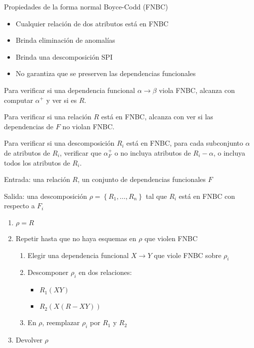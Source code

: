 \documentclass[a4paper, twoside]{article}
\begin{document}
\begin{propiedades}[0.9\textwidth]{Propiedades de la forma normal Boyce-Codd (FNBC)}
	\begin{itemize}
		\item Cualquier relación de dos atributos está en FNBC
		\item Brinda eliminación de anomalías
		\item Brinda una descomposición SPI
		\item No garantiza que se preserven las dependencias funcionales
	\end{itemize}
\end{propiedades}

Para verificar si una dependencia funcional $\alpha\to\beta$ viola FNBC, alcanza con computar $\alpha^{+}$ y ver si es $R$.

Para verificar si una relación $R$ está en FNBC, alcanza con ver si las dependencias de $F$ no violan FNBC.

Para verificar si una descomposición $R_{i}$ está en FNBC, para cada subconjunto $\alpha$ de atributos de $R_{i}$, verificar que $\alpha_{F}^{+}$ o no incluya atributos de $R_{i}-\alpha$, o incluya todos los atributos de $R_{i}$.

\begin{algorithm}[H]
	Entrada: una relación $R$, un conjunto de dependencias funcionales $F$

	Salida: una descomposición $\rho=\left\{ R_{1},\ldots,R_{n}\right\}$ tal que $R_{i}$ está en FNBC con respecto a $F_{i}$
	\begin{enumerate}
		\item $\rho=R$
		\item Repetir hasta que no haya esquemas en $\rho$ que violen FNBC
		\begin{enumerate}
			\item Elegir una dependencia funcional $X\to Y$ que viole FNBC sobre $\rho_{i}$
			\item Descomponer $\rho_{i}$ en dos relaciones:
			\begin{itemize}
				\item $R_{1}(XY)$
				\item $R_{2}(X(R-XY))$
			\end{itemize}
			\item En $\rho$, reemplazar $\rho_{i}$ por $R_{1}$ y $R_{2}$
		\end{enumerate}
	\item Devolver $\rho$
	\end{enumerate}
	\caption{Descomposición FNBC}
\end{algorithm}
\end{document}
